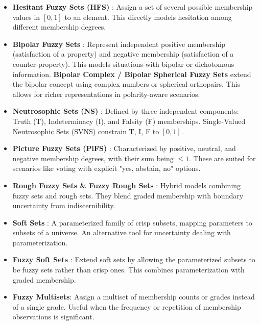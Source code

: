 \begin{itemize}
    \item \textbf{Hesitant Fuzzy Sets (HFS)} \cite{Torra2010}: Assign a set of several possible membership values in $[0,1]$ to an element. This directly models hesitation among different membership degrees.

    \item \textbf{Bipolar Fuzzy Sets} \cite{Zhang1994_Bipolar}: Represent independent positive membership (satisfaction of a property) and negative membership (satisfaction of a counter-property). This models situations with bipolar or dichotomous information. \textbf{Bipolar Complex / Bipolar Spherical Fuzzy Sets} extend the bipolar concept using complex numbers or spherical orthopairs. This allows for richer representations in polarity-aware scenarios.

    \item \textbf{Neutrosophic Sets (NS)} \cite{Smarandache1998_Neutrosophic, Wang2010_SVNS}: Defined by three independent components: Truth (T), Indeterminacy (I), and Falsity (F) memberships. Single-Valued Neutrosophic Sets (SVNS) constrain T, I, F to $[0,1]$.

    \item \textbf{Picture Fuzzy Sets (PiFS)} \cite{Cuong2013_Picture}: Characterized by positive, neutral, and negative membership degrees, with their sum being $\leq 1$. These are suited for scenarios like voting with explicit "yes, abstain, no" options.

    \item \textbf{Rough Fuzzy Sets \& Fuzzy Rough Sets} \cite{DuboisPrade1990_FuzzyRough}: Hybrid models combining fuzzy sets and rough sets. They blend graded membership with boundary uncertainty from indiscernibility.

    \item \textbf{Soft Sets} \cite{Molodtsov1999_Soft}: A parameterized family of crisp subsets, mapping parameters to subsets of a universe. An alternative tool for uncertainty dealing with parameterization.

    \item \textbf{Fuzzy Soft Sets} \cite{MajiBiswasRoy2001_FuzzySoft}: Extend soft sets by allowing the parameterized subsets to be fuzzy sets rather than crisp ones. This combines parameterization with graded membership.

    \item \textbf{Fuzzy Multisets}: Assign a multiset of membership counts or grades instead of a single grade. Useful when the frequency or repetition of membership observations is significant.


\end{itemize}
